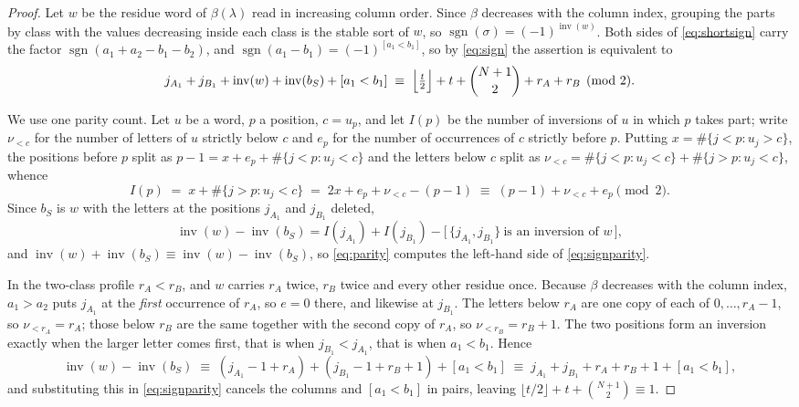 \documentclass[11pt,reqno]{amsart}
\theoremstyle{plain}
\theoremstyle{definition}
\newcommand{\inv}{\operatorname{inv}}
\newcommand{\sgn}{\operatorname{sgn}}
\begin{document}
\begin{proof}
Let $w$ be the residue word of $\beta(\lambda)$ read in increasing column order. Since $\beta$
decreases with the column index, grouping the parts by class with the values decreasing inside each
class is the stable sort of $w$, so $\sgn(\sigma)=(-1)^{\inv(w)}$. Both sides of
\eqref{eq:shortsign} carry the factor $\sgn(a_1+a_2-b_1-b_2)$, and
$\sgn(a_1-b_1)=(-1)^{[a_1<b_1]}$, so by \eqref{eq:sign} the assertion is equivalent to
\begin{equation}\label{eq:signparity}
j_{A_1}+j_{B_1}+\inv(w)+\inv(b_S)+[a_1<b_1]\;\equiv\;
\Bigl\lfloor\tfrac t2\Bigr\rfloor+t+\binom{N+1}{2}+r_A+r_B \pmod 2 .
\end{equation}

We use one parity count. Let $u$ be a word, $p$ a position, $c=u_p$, and let $I(p)$ be the number of
inversions of $u$ in which $p$ takes part; write $\nu_{<c}$ for the number of letters of $u$ strictly
below $c$ and $e_p$ for the number of occurrences of $c$ strictly before $p$. Putting
$x=\#\{j<p:u_j>c\}$, the positions before $p$ split as $p-1=x+e_p+\#\{j<p:u_j<c\}$ and the letters
below $c$ split as $\nu_{<c}=\#\{j<p:u_j<c\}+\#\{j>p:u_j<c\}$, whence
\begin{equation}\label{eq:parity}
I(p)\;=\;x+\#\{j>p:u_j<c\}\;=\;2x+e_p+\nu_{<c}-(p-1)\;\equiv\;(p-1)+\nu_{<c}+e_p \pmod 2 .
\end{equation}
Since $b_S$ is $w$ with the letters at the positions $j_{A_1}$ and $j_{B_1}$ deleted,
\[
\inv(w)-\inv(b_S)=I(j_{A_1})+I(j_{B_1})
-\bigl[\,\{j_{A_1},j_{B_1}\}\ \text{is an inversion of }w\,\bigr],
\]
and $\inv(w)+\inv(b_S)\equiv\inv(w)-\inv(b_S)$, so \eqref{eq:parity} computes the left-hand side of
\eqref{eq:signparity}.

In the two-class profile $r_A<r_B$, and $w$ carries $r_A$ twice, $r_B$ twice and every other residue
once. Because $\beta$ decreases with the column index, $a_1>a_2$ puts $j_{A_1}$ at the \emph{first}
occurrence of $r_A$, so $e=0$ there, and likewise at $j_{B_1}$. The letters below $r_A$ are one copy
of each of $0,\dots,r_A-1$, so $\nu_{<r_A}=r_A$; those below $r_B$ are the same together with the
second copy of $r_A$, so $\nu_{<r_B}=r_B+1$. The two positions form an inversion exactly when the
larger letter comes first, that is when $j_{B_1}<j_{A_1}$, that is when $a_1<b_1$. Hence
\[
\inv(w)-\inv(b_S)\;\equiv\;(j_{A_1}-1+r_A)+(j_{B_1}-1+r_B+1)+[a_1<b_1]
\;\equiv\;j_{A_1}+j_{B_1}+r_A+r_B+1+[a_1<b_1],
\]
and substituting this in \eqref{eq:signparity} cancels the columns and $[a_1<b_1]$ in pairs, leaving
$\lfloor t/2\rfloor+t+\binom{N+1}{2}\equiv1$.


\end{proof}
\end{document}
